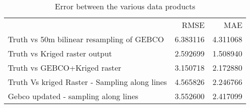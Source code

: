 \begin{table}
\caption{Error between the various data products}
\label{tab:rmse-truth-raster-sampled}
\begin{tabular}{lrr}
 & RMSE & MAE \\
Truth vs 50m bilinear resampling of GEBCO & 6.383116 & 4.311068 \\
Truth vs Kriged raster output & 2.592699 & 1.508940 \\
Truth vs GEBCO+Kriged raster & 3.150718 & 2.172880 \\
Truth Vs kriged Raster - Sampling along lines & 4.565826 & 2.246766 \\
Gebco updated - sampling along lines & 3.552600 & 2.417099 \\
\end{tabular}
\end{table}
